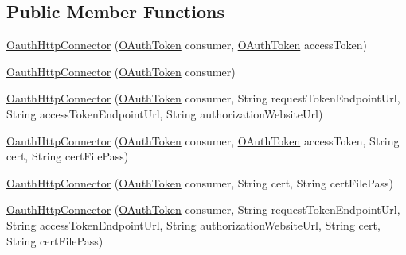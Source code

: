 \subsection*{Public Member Functions}
\begin{DoxyCompactItemize}
\item 
\hyperlink{classcom_1_1bluevia_1_1commons_1_1connector_1_1http_1_1oauth_1_1OauthHttpConnector_aadcc63658e94939b4eefd61b58b607fe}{OauthHttpConnector} (\hyperlink{classcom_1_1bluevia_1_1commons_1_1connector_1_1http_1_1oauth_1_1OAuthToken}{OAuthToken} consumer, \hyperlink{classcom_1_1bluevia_1_1commons_1_1connector_1_1http_1_1oauth_1_1OAuthToken}{OAuthToken} accessToken)
\item 
\hyperlink{classcom_1_1bluevia_1_1commons_1_1connector_1_1http_1_1oauth_1_1OauthHttpConnector_a7e4d118184b67e2eb880a49cacd5ca60}{OauthHttpConnector} (\hyperlink{classcom_1_1bluevia_1_1commons_1_1connector_1_1http_1_1oauth_1_1OAuthToken}{OAuthToken} consumer)
\item 
\hyperlink{classcom_1_1bluevia_1_1commons_1_1connector_1_1http_1_1oauth_1_1OauthHttpConnector_a65cf33bff257e6ad85cc048d282dc159}{OauthHttpConnector} (\hyperlink{classcom_1_1bluevia_1_1commons_1_1connector_1_1http_1_1oauth_1_1OAuthToken}{OAuthToken} consumer, String requestTokenEndpointUrl, String accessTokenEndpointUrl, String authorizationWebsiteUrl)
\item 
\hyperlink{classcom_1_1bluevia_1_1commons_1_1connector_1_1http_1_1oauth_1_1OauthHttpConnector_ab31eb4aa4585e745243eddf3b05d8797}{OauthHttpConnector} (\hyperlink{classcom_1_1bluevia_1_1commons_1_1connector_1_1http_1_1oauth_1_1OAuthToken}{OAuthToken} consumer, \hyperlink{classcom_1_1bluevia_1_1commons_1_1connector_1_1http_1_1oauth_1_1OAuthToken}{OAuthToken} accessToken, String cert, String certFilePass)
\item 
\hyperlink{classcom_1_1bluevia_1_1commons_1_1connector_1_1http_1_1oauth_1_1OauthHttpConnector_ae35b55aa924effdf0f14fb10a0857886}{OauthHttpConnector} (\hyperlink{classcom_1_1bluevia_1_1commons_1_1connector_1_1http_1_1oauth_1_1OAuthToken}{OAuthToken} consumer, String cert, String certFilePass)
\item 
\hyperlink{classcom_1_1bluevia_1_1commons_1_1connector_1_1http_1_1oauth_1_1OauthHttpConnector_a5f6b6f8558fde6da076f5548dde30a7b}{OauthHttpConnector} (\hyperlink{classcom_1_1bluevia_1_1commons_1_1connector_1_1http_1_1oauth_1_1OAuthToken}{OAuthToken} consumer, String requestTokenEndpointUrl, String accessTokenEndpointUrl, String authorizationWebsiteUrl, String cert, String certFilePass)

\end{DoxyCompactItemize}
